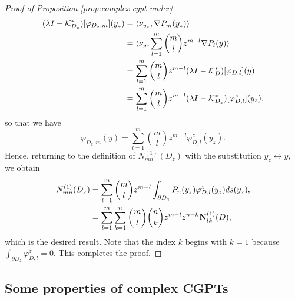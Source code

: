 \begin{proof}[Proof of Proposition \ref{prop:complex-cgpt-under}]
\begin{equation*}
\begin{aligned}
(\lambda I - \mathcal{K}^*_{D_z})[\varphi_{D_z,m}](y_z) & = \langle \nu_{y_z}, \nabla P_m(y_z) \rangle \\
 &= \langle \nu_{y},\sum_{l=1}^m  \binom {m} {l} z^{m-l}\nabla P_l(y)  \rangle \\
 &= \sum_{l=1}^m  \binom {m} {l} z^{m-l} (\lambda I-\mathcal{K}^{*}_D)[\varphi_{D,l}] (y) \\
 &= \sum_{l=1}^m  \binom {m} {l} z^{m-l} (\lambda I-\mathcal{K}^{*}_{D_z})[\varphi^z_{D,l}] (y_z), \\
\end{aligned}
\end{equation*}
so that we have
\begin{equation*}
\varphi_{D_z,m} (y)= \sum_{l=1}^m  \binom {m} {l} z^{m-l}
\varphi^z_{D,l}(y_z).
\end{equation*}
Hence, returning to the definition of $N_{mn}^{(1)}(D_z)$ with the
substitution $y_z\leftrightarrow y$, we obtain
\begin{equation*}
\begin{aligned}
N_{mn}^{(1)}(D_z) &= \sum_{l=1}^m \binom{m}{l} z^{m-l }\int_{\partial D_z}P_n(y_z) \varphi^z_{D,l}(y_z) ds(y_z), \\
 &= \sum_{l=1}^m \sum_{k=1}^n \binom{m}{l}\binom{n}{k}z^{m-l}z^{n-k}\mathbf{N}^{(1)}_{lk}(D),
\end{aligned}
\end{equation*}
which is the desired result. Note that the index $k$ begins with
$k=1$ because $\int_{\partial D_z}\varphi^z_{D,l} = 0$. This
completes the proof. \end{proof}

\subsection{Some properties of complex CGPTs}\label{sec:some-properties-ccgpt}

